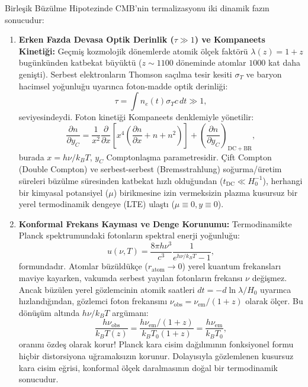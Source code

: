 Birleşik Büzülme Hipotezinde CMB'nin termalizasyonu iki dinamik fazın sonucudur:
\begin{enumerate}
    \item \textbf{Erken Fazda Devasa Optik Derinlik ($\tau \gg 1$) ve Kompaneets Kinetiği:}
          Geçmiş kozmolojik dönemlerde atomik ölçek faktörü $\lambda(z) = 1+z$ bugünkünden katbekat büyüktü ($z \sim 1100$ döneminde atomlar $1000$ kat daha genişti). Serbest elektronların Thomson saçılma tesir kesiti $\sigma_T$ ve baryon hacimsel yoğunluğu uyarınca foton-madde optik derinliği:
          \begin{equation}
              \tau = \int n_e(t) \sigma_T c \, dt \gg 1,
          \end{equation}
          seviyesindeydi. Foton kinetiği Kompaneets denklemiyle yönetilir:
          \begin{equation}
              \frac{\partial n}{\partial y_C} = \frac{1}{x^2} \frac{\partial}{\partial x} \left[ x^4 \left( \frac{\partial n}{\partial x} + n + n^2 \right) \right] + \left( \frac{\partial n}{\partial y_C} \right)_{\mathrm{DC+BR}},
          \end{equation}
          burada $x = h\nu/k_BT$, $y_C$ Comptonlaşma parametresidir. Çift Compton (Double Compton) ve serbest-serbest (Bremsstrahlung) soğurma/üretim süreleri büzülme süresinden katbekat hızlı olduğundan ($t_{\mathrm{DC}} \ll H_0^{-1}$), herhangi bir kimyasal potansiyel ($\mu$) birikmesine izin vermeksizin plazma kusursuz bir yerel termodinamik dengeye (LTE) ulaştı ($\mu \equiv 0, y \equiv 0$).
    \item \textbf{Konformal Frekans Kayması ve Denge Korunumu:}
          Termodinamikte Planck spektrumundaki fotonların spektral enerji yoğunluğu:
          \begin{equation}
              u(\nu, T) = \frac{8\pi h \nu^3}{c^3} \frac{1}{e^{h\nu / k_B T} - 1},
          \end{equation}
          formundadır. Atomlar büzüldükçe ($r_{\mathrm{atom}} \to 0$) yerel kuantum frekansları maviye kayarken, vakumda serbest yayılan fotonların frekansı $\nu$ değişmez. Ancak büzülen yerel gözlemcinin atomik saatleri $dt = -d\ln\lambda / H_0$ uyarınca hızlandığından, gözlemci foton frekansını $\nu_{\mathrm{obs}} = \nu_{\mathrm{em}} / (1+z)$ olarak ölçer. Bu dönüşüm altında $h\nu / k_B T$ argümanı:
          \begin{equation}
              \frac{h \nu_{\mathrm{obs}}}{k_B T(z)} = \frac{h \nu_{\mathrm{em}} / (1+z)}{k_B T_0 (1+z)} = \frac{h \nu_{\mathrm{em}}}{k_B T_0},
          \end{equation}
          oranını özdeş olarak korur! Planck kara cisim dağılımının fonksiyonel formu hiçbir distorsiyona uğramaksızın korunur. Dolayısıyla gözlemlenen kusursuz kara cisim eğrisi, konformal ölçek daralmasının doğal bir termodinamik sonucudur.
\end{enumerate}


